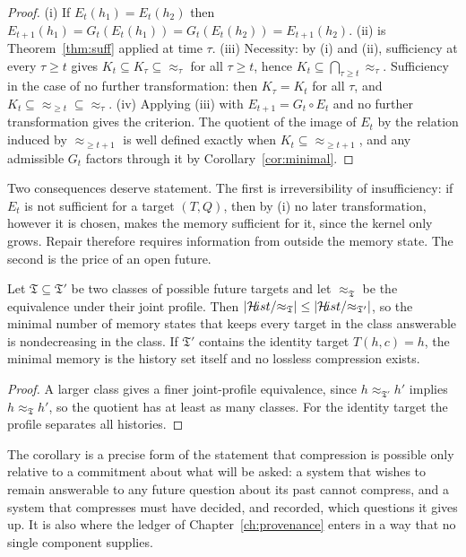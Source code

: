 \begin{proof}
(i) If $E_t(h_1)=E_t(h_2)$ then $E_{t+1}(h_1)=G_t(E_t(h_1))=G_t(E_t(h_2))=E_{t+1}(h_2)$. (ii) is Theorem~\ref{thm:suff} applied at time $\tau$. (iii) Necessity: by (i) and (ii), sufficiency at every $\tau\ge t$ gives $K_t\subseteq K_\tau\subseteq{\approx_\tau}$ for all $\tau\ge t$, hence $K_t\subseteq\bigcap_{\tau\ge t}{\approx_\tau}$. Sufficiency in the case of no further transformation: then $K_\tau=K_t$ for all $\tau$, and $K_t\subseteq{\approx_{\ge t}}\subseteq{\approx_\tau}$. (iv) Applying (iii) with $E_{t+1}=G_t\circ E_t$ and no further transformation gives the criterion. The quotient of the image of $E_t$ by the relation induced by $\approx_{\ge t+1}$ is well defined exactly when $K_t\subseteq{\approx_{\ge t+1}}$, and any admissible $G_t$ factors through it by Corollary~\ref{cor:minimal}.
\end{proof}

Two consequences deserve statement. The first is irreversibility of insufficiency: if $E_t$ is not sufficient for a target $(T,Q)$, then by (i) no later transformation, however it is chosen, makes the memory sufficient for it, since the kernel only grows. Repair therefore requires information from outside the memory state. The second is the price of an open future.

\begin{corollary}\label{cor:commit}
Let $\mathfrak T\subseteq\mathfrak T'$ be two classes of possible future targets and let $\approx_{\mathfrak T}$ be the equivalence under their joint profile. Then $|\mathcal{H}\!ist/{\approx_{\mathfrak T}}|\le|\mathcal{H}\!ist/{\approx_{\mathfrak T'}}|$, so the minimal number of memory states that keeps every target in the class answerable is nondecreasing in the class. If $\mathfrak T'$ contains the identity target $T(h,c)=h$, the minimal memory is the history set itself and no lossless compression exists.
\end{corollary}

\begin{proof}
A larger class gives a finer joint-profile equivalence, since $h\approx_{\mathfrak T'}h'$ implies $h\approx_{\mathfrak T}h'$, so the quotient has at least as many classes. For the identity target the profile separates all histories.
\end{proof}

The corollary is a precise form of the statement that compression is possible only relative to a commitment about what will be asked: a system that wishes to remain answerable to any future question about its past cannot compress, and a system that compresses must have decided, and recorded, which questions it gives up. It is also where the ledger of Chapter~\ref{ch:provenance} enters in a way that no single component supplies.

